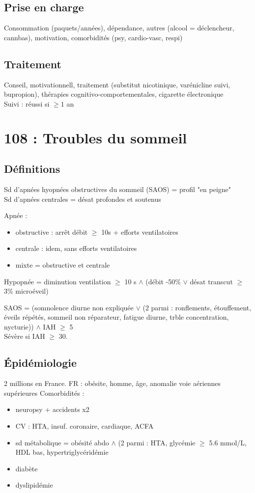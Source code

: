\subsection{Prise en charge}
Consommation (paquets/années), dépendance, autres (alcool = déclencheur,
cannbas), motivation, comorbidités (psy, cardio-vasc, respi)
\subsection{Traitement}
Conseil, motivationnell, traitement (substitut nicotinique, varénicline \danger
suivi, bupropion), thérapies cognitivo-comportementales, cigarette
électronique\\
Suivi : réussi si \(\ge 1\) an



\section{108 : Troubles du sommeil}
\subsection{Définitions}
\danger Sd d'apnées hyopnées obstructives du sommeil (SAOS) = profil "en peigne"\\
Sd d'apnées centrales = désat profondes et soutenus

Apnée : 
\begin{itemize}
  \item obstructive : arrêt débit \(\ge\) 10s + efforts ventilatoires
  \item centrale : idem, sans efforts ventilatoires
  \item mixte = obstructive et centrale
\end{itemize}
Hypopnée = diminution ventilation \(\ge\) 10 s \(\wedge\) (débit -50\% \(\vee\) désat
transcut \(\ge\) 3\% \textpm{} microéveil)

SAOS = (somnolence diurne non expliquée \(\vee\) (2 parmi : ronflements, étouffement,
éveils répétés, sommeil non réparateur, fatigue diurne, trble concentration,
nycturie)) \(\wedge{}\)  IAH \(\ge\) 5\\
Sévère si IAH \(\ge\) 30.
\subsection{Épidémiologie}
2 millions en France.
FR : obésite, homme, âge, anomalie voie aériennes supérieures
Comorbidités :
\begin{itemize}
  \item neuropsy + accidents x2
  \item CV : HTA, insuf. coronaire, cardiaque, ACFA
  \item sd métabolique = obésité abdo \(\wedge\) (2 parmi : HTA, glycémie \(\ge\) 5.6 mmol/L,
    HDL bas, hypertriglycéridémie
  \item diabète
  \item dyslipidémie
\end{itemize}

